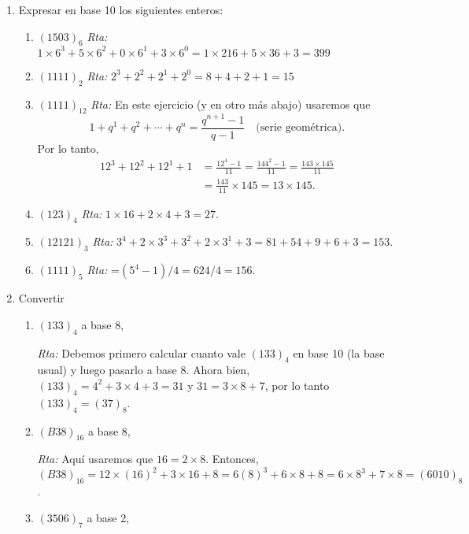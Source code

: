 \documentclass[a4paper,12pt,twoside,spanish,reqno]{amsbook}
\numberwithin{equation}{section}
\newcommand{\rta}{\noindent\textit{Rta: }}
\begin{document}
\begin{enumerate}
\item Expresar en base 10 los siguientes enteros:
\begin{enumerate}
    \item 
    $(1503)_6$  \rta  $1 \times 6^3+ 5 \times 6^2+0 \times 6^1+3 \times 6^0=1  \times 216+ 5 \times 36 +3=399$
    \item
    $(1111)_2$  \rta  $2^3+2^2+2^1+2^0= 8+4+2+1=15$
    \item
    $(1111)_{12}$  \rta  En este ejercicio (y en otro más abajo) usaremos  que 
    \begin{equation*}
        1+ q^1 +q^2 +\cdots +q^n =  \frac{q^{n+1} -1}{q-1}\quad \text{(serie geométrica)}.
    \end{equation*}
    Por lo tanto,
    \begin{align*}
        12^3+12^2+12^1+1 &=\frac{12^4-1}{11}=\frac{144^2-1}{11}=\frac{143\times145}{11}\\
        &= \frac{143}{11} \times 145  = 13 \times 145.
    \end{align*}
     
    \item
    $(123)_4$  \rta  $1\times 16+2\times 4+3=27$.
    \item
    $(12121)_3$  \rta $3^4+2\times 3^3+3^2+2\times 3^1+3=81+54+9+6+3=153$.
    \item
    $(1111)_5$  \rta =$(5^4-1)/4=624/4 = 156$.
\end{enumerate}



\item Convertir
\begin{enumerate}
    \item
    $(133)_4$ a base 8,  
    
    \rta  Debemos primero calcular cuanto vale  $(133)_4$ en base 10 (la base usual) y luego pasarlo a base 8. Ahora bien, $(133)_4 = 4^2+3\times 4+3 = 31$ y $31 = 3 \times 8 + 7$, por lo tanto  $(133)_4 =  (37)_8$.
    \item
    $(B38)_{16}$ a base 8,  
    
    \rta  Aquí usaremos que $16 = 2 \times 8$. Entonces,  $(B38)_{16} = 12\times (16)^2+3\times 16+8=6(8)^3+6\times 8+8=6\times 8^3+7\times 8=(6010)_8$.
    \item
    $(3506)_7$ a base 2, 
    

\end{enumerate}
\end{enumerate}
\end{document}
